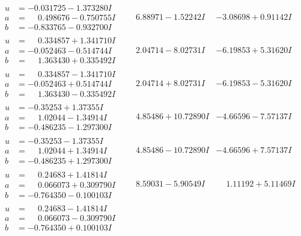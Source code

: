 \documentclass[1p]{elsarticle_modified}
\theoremstyle{definition}
\begin{document}
$$\begin{array}{c|c|c}
\begin{aligned}
u &= -0.031725 - 1.373280 I \\
a &= \phantom{-}0.498676 - 0.750755 I \\
b &= -0.833765 - 0.932700 I\end{aligned}
 & \phantom{-}6.88971 - 1.52242 I & -3.08698 + 0.91142 I \\ \hline\begin{aligned}
u &= \phantom{-}0.334857 + 1.341710 I \\
a &= -0.052463 - 0.514744 I \\
b &= \phantom{-}1.363430 + 0.335492 I\end{aligned}
 & \phantom{-}2.04714 - 8.02731 I & -6.19853 + 5.31620 I \\ \hline\begin{aligned}
u &= \phantom{-}0.334857 - 1.341710 I \\
a &= -0.052463 + 0.514744 I \\
b &= \phantom{-}1.363430 - 0.335492 I\end{aligned}
 & \phantom{-}2.04714 + 8.02731 I & -6.19853 - 5.31620 I \\ \hline\begin{aligned}
u &= -0.35253 + 1.37355 I \\
a &= \phantom{-}1.02044 - 1.34914 I \\
b &= -0.486235 - 1.297300 I\end{aligned}
 & \phantom{-}4.85486 + 10.72890 I & -4.66596 - 7.57137 I \\ \hline\begin{aligned}
u &= -0.35253 - 1.37355 I \\
a &= \phantom{-}1.02044 + 1.34914 I \\
b &= -0.486235 + 1.297300 I\end{aligned}
 & \phantom{-}4.85486 - 10.72890 I & -4.66596 + 7.57137 I \\ \hline\begin{aligned}
u &= \phantom{-}0.24683 + 1.41814 I \\
a &= \phantom{-}0.066073 + 0.309790 I \\
b &= -0.764350 - 0.100103 I\end{aligned}
 & \phantom{-}8.59031 - 5.90549 I & \phantom{-}1.11192 + 5.11469 I \\ \hline\begin{aligned}
u &= \phantom{-}0.24683 - 1.41814 I \\
a &= \phantom{-}0.066073 - 0.309790 I \\
b &= -0.764350 + 0.100103 I\end{aligned}

\end{array}$$
\end{document}
